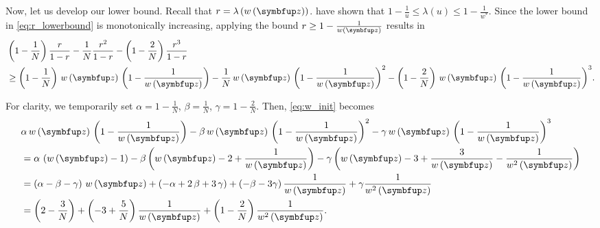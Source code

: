 \begin{proofEnd}
Now, let us develop our lower bound.
Recall that \(r = \lambda\left(w\left(\vz\right)\right)\).
\citet[Proof of Theorem 3]{tan_monte_2006} have shown that \(1 - \frac{1}{u} \leq \lambda\left(u\right) \leq 1 - \frac{1}{w^*}\).
Since the lower bound in \cref{eq:r_lowerbound} is monotonically increasing, applying the bound \(r \geq 1 - \frac{1}{w\left(\vz\right)}\) results in
\begin{align}
  &\left(1 - \frac{1}{N}\right) \frac{r}{1-r}
  -
  \frac{1}{N} \frac{r^2}{1-r}
  -
  \left(1 - \frac{2}{N}\right) \frac{r^3}{1-r}
  \nonumber \\
  &\geq
  \left(1 - \frac{1}{N}\right) \, w\left(\vz\right) \, \left(1 - \frac{1}{w\left(\vz\right)}\right)
  -
  \frac{1}{N} \, w\left(\vz\right) \, {\left(1 - \frac{1}{w\left(\vz\right)}\right)}^2
  -
  \left(1 - \frac{2}{N}\right) \, w\left(\vz\right) \, {\left(1 - \frac{1}{w\left(\vz\right)}\right)}^3.\label{eq:w_init}
\end{align}

For clarity, we temporarily set \(\alpha = 1 - \frac{1}{N}\), \(\beta = \frac{1}{N}\), \(\gamma = 1 - \frac{2}{N}\).
Then, \cref{eq:w_init} becomes
\begin{align}
  &\alpha \, w\left(\vz\right) \, \left(1 - \frac{1}{w\left(\vz\right)}\right)
  -
  \beta \, w\left(\vz\right) \, {\left(1 - \frac{1}{w\left(\vz\right)}\right)}^2
  -
  \gamma \, w\left(\vz\right) \, {\left(1 - \frac{1}{w\left(\vz\right)}\right)}^3 \nonumber
  \\
  &=
  \alpha \, \left(w\left(\vz\right) - 1\right)
  -
  \beta \, {\left(w\left(\vz\right) - 2 + \frac{1}{w\left(\vz\right)} \right)}
  -
  \gamma \, {\left(w\left(\vz\right) - 3 + \frac{3}{w\left(\vz\right)} - \frac{1}{w^2\left(\vz\right)}  \right)}
  \\
  &=
  \left(\alpha - \beta - \gamma\right) \, w\left(\vz\right)
  +
  \left(-\alpha + 2\,\beta + 3\,\gamma\right)
  +
  \left(-\beta - 3 \gamma\right) \frac{1}{w\left(\vz\right)}
  +
  \gamma \frac{1}{w^2\left(\vz\right)}
  \\
  &=
  \left(2 - \frac{3}{N}\right)
  +
  \left(-3 + \frac{5}{N}\right) \frac{1}{w\left(\vz\right)}
  +
  \left(1 - \frac{2}{N}\right)  \frac{1}{w^2\left(\vz\right)}.
\end{align}


\end{proofEnd}
